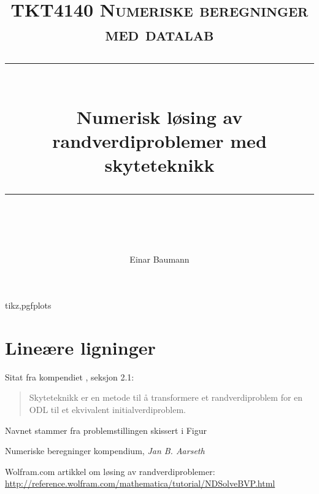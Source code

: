 


\usepackage{url}

\usepackage{compat=1.9}{tikz,pgfplots}

\author{Einar Baumann}
\title{
    \vspace{-1in}
    \normalfont \normalsize \textsc{TKT4140 Numeriske beregninger med datalab} \\ [20pt]
    \vspace{0.1in}
    \rule{\textwidth}{0.5pt} \\[1cm]
    {\sffamily \huge Numerisk løsing av randverdiproblemer med skyteteknikk} \\
    \vspace{0.1in}
    \rule{\textwidth}{2pt} \\[0.7cm]
}


\maketitle
\thispagestyle{empty}
\clearpage

\section{Lineære ligninger} %
\label{sec:line_re_ligninger}
Sitat fra kompendiet \cite{komp}, seksjon 2.1:
\begin{quote}
  Skyteteknikk er en metode til å transformere et randverdiproblem for en ODL til et ekvivalent initialverdiproblem.
\end{quote}

Navnet stammer fra problemstillingen skissert i Figur





\begin{thebibliography}{1}
   Numeriske beregninger kompendium, \emph{Jan B. Aarseth}

   Wolfram.com artikkel om løsing av randverdiproblemer: \url{http://reference.wolfram.com/mathematica/tutorial/NDSolveBVP.html}
\end{thebibliography}



